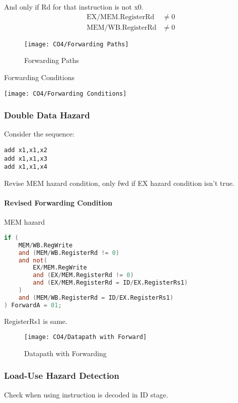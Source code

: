 And only if Rd for that instruction is not x0. 
\begin{align*}
    \text{EX/MEM.RegisterRd} &\ne 0\\
    \text{MEM/WB.RegisterRd} &\ne 0
\end{align*}

\begin{figure}[!htb]
    \centering
    \texttt{[image: CO4/Forwarding Paths]}
    \caption{Forwarding Paths}
\end{figure}

\begin{table}[!htb]
    \centering
    \caption{Forwarding Conditions}
    \texttt{[image: CO4/Forwarding Conditions]}
\end{table}

\subsubsection{Double Data Hazard}
Consider the sequence:
\begin{lstlisting}[language={[x86masm]Assembler}]
add x1,x1,x2
add x1,x1,x3
add x1,x1,x4
\end{lstlisting}

Revise MEM hazard condition, only fwd if EX hazard condition isn't true. 

\paragraph{Revised Forwarding Condition}
MEM hazard

\begin{lstlisting}[language=verilog,morekeywords={set_property,get_ports}, basicstyle=\small]
if (
    MEM/WB.RegWrite
    and (MEM/WB.RegisterRd != 0)
    and not(
        EX/MEM.RegWrite 
        and (EX/MEM.RegisterRd != 0)
        and (EX/MEM.RegisterRd = ID/EX.RegisterRs1)
    )
    and (MEM/WB.RegisterRd = ID/EX.RegisterRs1)
) ForwardA = 01;
\end{lstlisting}
RegisterRs1 is same. 

\begin{figure}[!htb]
    \centering
    \texttt{[image: CO4/Datapath with Forward]}
    \caption{Datapath with Forwarding}
\end{figure}

\subsubsection{Load-Use Hazard Detection}
Check when using instruction is decoded in ID stage. 

